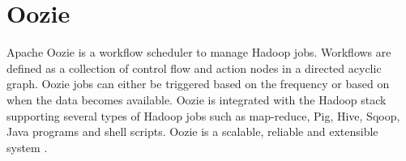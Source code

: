 \section{Oozie}
Apache Oozie is a workflow scheduler to manage Hadoop jobs. Workflows are defined as a collection of control flow and action nodes in a directed acyclic graph. Oozie  jobs can either be triggered based on the frequency or based on when the data becomes available. Oozie is integrated with the Hadoop stack supporting several types of Hadoop jobs such as map-reduce, Pig, Hive, Sqoop, Java programs and shell scripts. Oozie is a scalable, reliable and extensible system \cite{oozie}.

